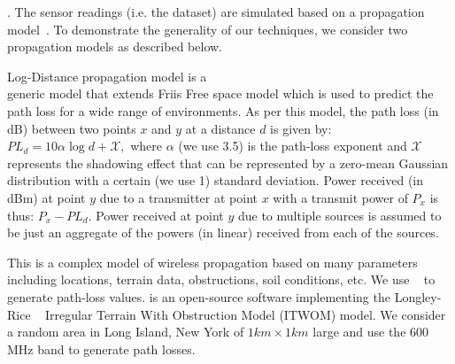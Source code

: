 
.
The sensor readings (i.e. the dataset) are simulated based on a propagation model~\cite{yuning2023}. 
To demonstrate the generality of our techniques, we consider two propagation models as described below. 

Log-Distance propagation model is a \\
generic model that extends Friis Free space model 
which is used to predict the path loss for a wide range of environments. 
As per this model, the path loss (in dB) between 
two points $x$ and $y$ at a distance $d$ is given by: $PL_d = 10\alpha\log{d} + \mathcal{X},$
where $\alpha$ (we use 3.5) is the path-loss exponent and $\mathcal{X}$ represents the shadowing effect that can be represented by a zero-mean Gaussian distribution with a certain (we use 1) standard deviation. 
Power received (in dBm) at point $y$ due to a transmitter at point $x$ with a 
transmit power of $P_x$ is thus: $P_{x} - PL_d$.
Power received at point $y$ due to multiple sources is assumed to be just an 
aggregate  of the powers (in linear) received from each of the sources.


This is a complex model of wireless propagation based on many parameters including locations, terrain data, obstructions, soil conditions, etc.
We use \splat~\cite{splat} to generate path-loss values. \splat is an open-source software implementing the Longley-Rice ~\cite{chamberlin82} Irregular Terrain With Obstruction Model (ITWOM) model.
We consider a random area in Long Island, New York of $1km \times 1km$ large and use the 600 MHz band to generate path losses.



